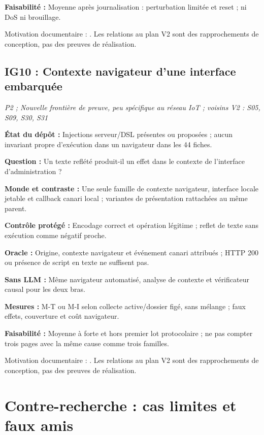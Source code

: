 \documentclass[11pt,a4paper]{article}
\begin{document}
\textbf{Faisabilité :} Moyenne après journalisation : perturbation limitée et reset ; ni DoS ni brouillage.

Motivation documentaire : \cite{mqtt,coap,nmap,etsi}. Les relations au plan V2 sont des rapprochements de conception, pas des preuves de réalisation.

\begin{samepage}\subsection{IG10 : Contexte navigateur d'une interface embarquée}
\textit{P2 ; Nouvelle frontière de preuve, peu spécifique au réseau IoT ; voisins V2 : S05, S09, S30, S31}

\textbf{État du dépôt :} Injections serveur/DSL présentes ou proposées ; aucun invariant propre d'exécution dans un navigateur dans les 44 fiches.
\par\end{samepage}
\textbf{Question :} Un texte reflété produit-il un effet dans le contexte de l'interface d'administration ?

\textbf{Monde et contraste :} Une seule famille de contexte navigateur, interface locale jetable et callback canari local ; variantes de présentation rattachées au même parent.

\textbf{Contrôle protégé :} Encodage correct et opération légitime ; reflet de texte sans exécution comme négatif proche.

\textbf{Oracle :} Origine, contexte navigateur et événement canari attribués ; HTTP 200 ou présence de script en texte ne suffisent pas.

\textbf{Sans LLM :} Même navigateur automatisé, analyse de contexte et vérificateur causal pour les deux bras.

\textbf{Mesures :} M-T ou M-I selon collecte active/dossier figé, sans mélange ; faux effets, couverture et coût navigateur.

\textbf{Faisabilité :} Moyenne à forte et hors premier lot protocolaire ; ne pas compter trois pages avec la même cause comme trois familles.

Motivation documentaire : \cite{goat-sol}. Les relations au plan V2 sont des rapprochements de conception, pas des preuves de réalisation.

\section{Contre-recherche : cas limites et faux amis}
\end{document}
